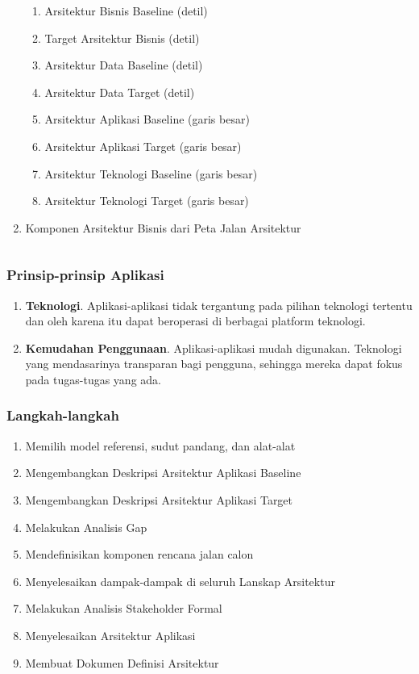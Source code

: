 \documentclass[aspectratio=169]{beamer}
\begin{document}
\begin{frame}
\begin{columns}
\begin{column}{0.5\textwidth}
\begin{center}
\begin{enumerate}
					\begin{enumerate}
						\item Arsitektur Bisnis Baseline (detil)
						\item Target Arsitektur Bisnis (detil)
						\item Arsitektur Data Baseline (detil)
						\item Arsitektur Data Target (detil)
						\item Arsitektur Aplikasi Baseline (garis besar)
						\item Arsitektur Aplikasi Target (garis besar)
						\item Arsitektur Teknologi Baseline (garis besar)
						\item Arsitektur Teknologi Target (garis besar)
					\end{enumerate}
					\item Komponen Arsitektur Bisnis dari Peta Jalan Arsitektur
				\end{enumerate}
			\end{center}
		\end{column}
	\end{columns}
\end{frame}

\begin{frame}
	\frametitle{Prinsip-prinsip Aplikasi}
	\begin{enumerate}
		\item \textbf{Teknologi}.
		Aplikasi-aplikasi tidak tergantung pada pilihan teknologi tertentu dan oleh karena itu dapat beroperasi di berbagai platform teknologi.
		\item \textbf{Kemudahan Penggunaan}.
		Aplikasi-aplikasi mudah digunakan. Teknologi yang mendasarinya transparan bagi pengguna, sehingga mereka dapat fokus pada tugas-tugas yang ada.
	\end{enumerate}
\end{frame}


\begin{frame}
	\frametitle{Langkah-langkah}
	\begin{enumerate}
		\item Memilih model referensi, sudut pandang, dan alat-alat
		\item Mengembangkan Deskripsi Arsitektur Aplikasi Baseline
		\item Mengembangkan Deskripsi Arsitektur Aplikasi Target
		\item Melakukan Analisis Gap
		\item Mendefinisikan komponen rencana jalan calon
		\item Menyelesaikan dampak-dampak di seluruh Lanskap Arsitektur
		\item Melakukan Analisis Stakeholder Formal
		\item Menyelesaikan Arsitektur Aplikasi
		\item Membuat Dokumen Definisi Arsitektur
	\end{enumerate}
\end{frame}
\end{document}
